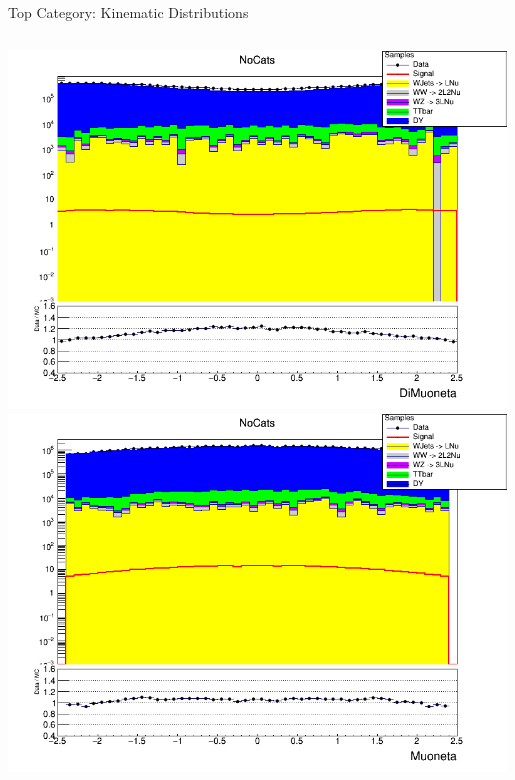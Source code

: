 \documentclass[pdf, 9pt]{beamer}
\begin{document}
\begin{frame}{Top Category: Kinematic Distributions}
\begin{columns}[T]
\begin{column}{0.5\textwidth}
        \includegraphics[width=0.99\textwidth, height=0.45\textheight]{figs/higgs/distributions/baseline_rochester/distribution__NoCats__DiMuoneta__logY.png}\\
        \includegraphics[width=0.99\textwidth, height=0.45\textheight]{figs/higgs/distributions/baseline_rochester/distribution__NoCats__Muoneta__logY.png}
      \end{column}
    \end{columns}
  \end{frame}
\end{document}
